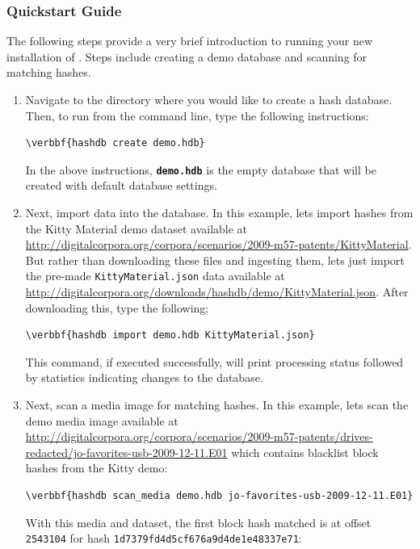 \documentclass[11pt,fleqn]{article} %
\begin{document}
\subsubsection{Quickstart Guide}
The following steps provide a very brief introduction to running your new installation of \hdb. Steps include creating a demo database and scanning for matching hashes. 
\begin{enumerate}
\item Navigate to the directory where you would like to create a hash database. Then, to run \hdb from the command line, type the following instructions: 
\begin{Verbatim}[commandchars=\\\{\}]
\verbbf{hashdb create demo.hdb}
\end{Verbatim} 

In the above instructions, \texttt{\textbf{demo.hdb}} is the empty database that will be created with default database settings.

\item Next, import data into the database. In this example, lets import hashes from the Kitty Material demo dataset available at \url{http://digitalcorpora.org/corpora/scenarios/2009-m57-patents/KittyMaterial}. But rather than downloading these files and ingesting them, lets just import the pre-made \verb+KittyMaterial.json+ data available at \url{http://digitalcorpora.org/downloads/hashdb/demo/KittyMaterial.json}. After downloading this, type the following:
\begin{Verbatim}[commandchars=\\\{\}]
\verbbf{hashdb import demo.hdb KittyMaterial.json}
\end{Verbatim} 
This command, if executed successfully, will print processing status followed by statistics indicating changes to the database.

\item Next, scan a media image for matching hashes. In this example, lets scan the demo media image available at \url{http://digitalcorpora.org/corpora/scenarios/2009-m57-patents/drives-redacted/jo-favorites-usb-2009-12-11.E01} which contains blacklist block hashes from the Kitty demo:
\begin{Verbatim}[commandchars=\\\{\}]
\verbbf{hashdb scan_media demo.hdb jo-favorites-usb-2009-12-11.E01}
\end{Verbatim} 
With this media and dataset, the first block hash matched is at offset \verb+2543104+ for hash \verb+1d7379fd4d5cf676a9d4de1e48337e71+:


\end{enumerate}
\end{document}
